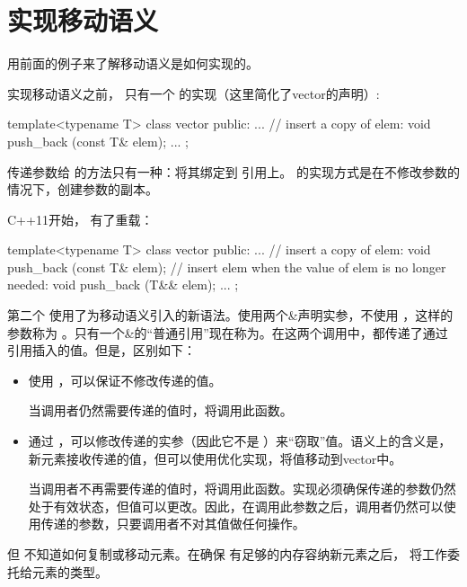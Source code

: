 \section{实现移动语义}
用前面的例子来了解移动语义是如何实现的。

实现移动语义之前， 只有一个  的实现（这里简化了vector的声明）:

\begin{cppcode}
template<typename T>
class vector {
	public:
	...
	// insert a copy of elem:
	void push_back (const T& elem);
	...
};
\end{cppcode}

传递参数给  的方法只有一种：将其绑定到  引用上。 的实现方式是在不修改参数的情况下，创建参数的副本。

C++11开始， 有了重载：

\begin{cppcode}
template<typename T>
class vector {
	public:
	...
	// insert a copy of elem:
	void push_back (const T& elem);
	// insert elem when the value of elem is no longer needed:
	void push_back (T&& elem);
	...
};
\end{cppcode}

第二个  使用了为移动语义引入的新语法。使用两个\&声明实参，不使用 ，这样的参数称为 。只有一个\&的“普通引用”现在称为。在这两个调用中，都传递了通过引用插入的值。但是，区别如下：

\begin{itemize}
	\item 使用 ，可以保证不修改传递的值。

	当调用者仍然需要传递的值时，将调用此函数。
	\item 通过 ，可以修改传递的实参（因此它不是 ）来“窃取”值。语义上的含义是，新元素接收传递的值，但可以使用优化实现，将值移动到vector中。

	当调用者不再需要传递的值时，将调用此函数。实现必须确保传递的参数仍然处于有效状态，但值可以更改。因此，在调用此参数之后，调用者仍然可以使用传递的参数，只要调用者不对其值做任何操作。
\end{itemize}

但  不知道如何复制或移动元素。在确保  有足够的内存容纳新元素之后， 将工作委托给元素的类型。

